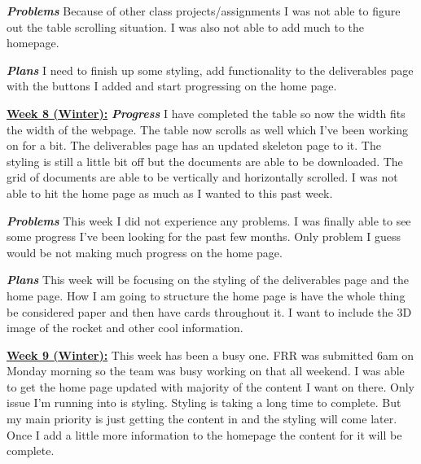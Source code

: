 \documentclass[onecolumn, draftclsnofoot, 10pt, compsoc]{IEEEtran}
\begin{document}
\textbf{\textit{{Problems}}}
\newline Because of other class projects/assignments I was not able to figure out the table scrolling situation. I was also not able to add much to the homepage. \newline 

\textbf{\textit{{Plans}}}
\newline I need to finish up some styling, add functionality to the deliverables page with the buttons I added and start progressing on the home page. \newline 

\underline{\textbf{Week 8 (Winter):}}
\newline\textbf{\textit{{Progress}}}
\newline I have completed the table so now the width fits the width of the webpage. The table now scrolls as well which I've been working on for a bit. The deliverables page has an updated skeleton page to it. The styling is still a little bit off but the documents are able to be downloaded. The grid of documents are able to be vertically and horizontally scrolled. I was not able to hit the home page as much as I wanted to this past week. \newline 

\textbf{\textit{{Problems}}}
\newline This week I did not experience any problems. I was finally able to see some progress I've been looking for the past few months. Only problem I guess would be not making much progress on the home page. \newline 

\textbf{\textit{{Plans}}}
\newline This week will be focusing on the styling of the deliverables page and the home page. How I am going to structure the home page is have the whole thing be considered paper and then have cards throughout it. I want to include the 3D image of the rocket and other cool information. \newline 

\underline{\textbf{Week 9 (Winter):}}
\newline This week has been a busy one. FRR was submitted 6am on Monday morning so the team was busy working on that all weekend. I was able to get the home page updated with majority of the content I want on there. Only issue I'm running into is styling. Styling is taking a long time to complete. But my main priority is just getting the content in and the styling will come later. Once I add a little more information to the homepage the content for it will be complete. \newline  
\end{document}
